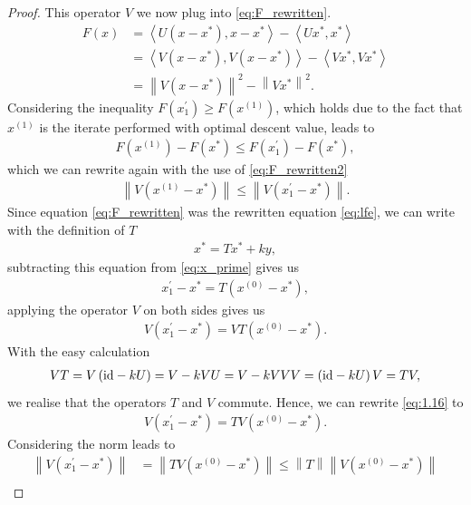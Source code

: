 \begin{proof}
This operator $V$ we now plug into \eqref{eq:F_rewritten}.
\begin{align}\label{eq:F_rewritten2}
F(x) &= \left\langle U(x - x^{\ast}), x - x^{\ast} \right\rangle - \left\langle Ux^{\ast}, x^{\ast} \right\rangle\nonumber\\
&= \left\langle V(x - x^{\ast}), V(x - x^{\ast}) \right\rangle - \left\langle Vx^{\ast}, Vx^{\ast} \right\rangle\nonumber\\
&= \left\|V(x - x^{\ast}) \right\|^2 - \left\|Vx^{\ast} \right\|^2.
\end{align}
Considering the inequality $F(x^{\prime}_1) \geq F(x^{(1)})$, which holds due to the fact that $x^{(1)}$ is the iterate performed with optimal descent value, leads to
\begin{align*}
F(x^{(1)}) -F(x^{\ast}) \leq F(x^{\prime}_1) -F(x^{\ast}),
\end{align*}
which we can rewrite again with the use of \eqref{eq:F_rewritten2}
\begin{align}\label{ineq:1}
\left\| V(x^{(1)} - x^{\ast}) \right\| \leq \left\| V(x^{\prime}_1 - x^{\ast}) \right\|.
\end{align}
Since equation \eqref{eq:F_rewritten} was the rewritten equation \eqref{eq:lfe}, we can write with the definition of $T$
\begin{align*}
x^{\ast} = Tx^{\ast} + ky,
\end{align*}
subtracting this equation from \eqref{eq:x_prime} gives us
\begin{align*}
x^{\prime}_1 - x^{\ast} = T(x^{(0)} - x^{\ast}),
\end{align*}
applying the operator $V$ on both sides gives us
\begin{align}\label{eq:1.16}
V\left(x^{\prime}_1 - x^{\ast}\right) = VT(x^{(0)} - x^{\ast}).
\end{align}
With the easy calculation
\begin{align*}
VT = V\left( \mathrm{id} - kU\right) = V -kVU = V - kVVV = \left(\mathrm{id}-kU\right)V = TV,
\end{align*}
we realise that the operators $T$ and $V$ commute. Hence, we can rewrite \eqref{eq:1.16} to
\begin{align*}
V\left(x^{\prime}_1 - x^{\ast}\right) = TV(x^{(0)} - x^{\ast}).
\end{align*}
Considering the norm leads to
\begin{align*}
\left\|V\left(x^{\prime}_1 - x^{\ast}\right)\right\| &= \left\| TV(x^{(0)} - x^{\ast})\right\| \leq \left\| T \right\| \left\|V(x^{(0)} - x^{\ast})\right\|\\

\end{align*}
\end{proof}
